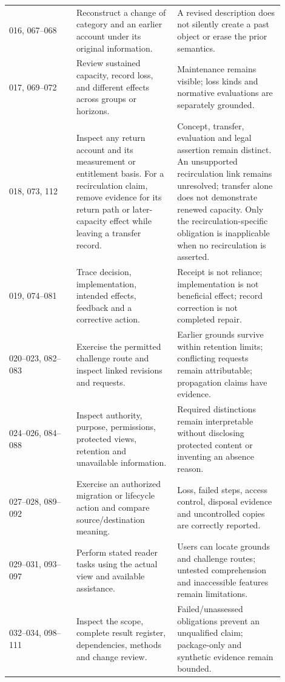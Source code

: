\documentclass[11pt,a4paper]{article}
\begin{document}
\begin{longtable}{@{}L{0.22\linewidth}L{0.33\linewidth}L{0.35\linewidth}@{}}
016, 067--068 & Reconstruct a change of category and an earlier account under its original information. & A revised description does not silently create a past object or erase the prior semantics.\\
017, 069--072 & Review sustained capacity, record loss, and different effects across groups or horizons. & Maintenance remains visible; loss kinds and normative evaluations are separately grounded.\\
018, 073, 112 & Inspect any return account and its measurement or entitlement basis. For a recirculation claim, remove evidence for its return path or later-capacity effect while leaving a transfer record. & Concept, transfer, evaluation and legal assertion remain distinct. An unsupported recirculation link remains unresolved; transfer alone does not demonstrate renewed capacity. Only the recirculation-specific obligation is inapplicable when no recirculation is asserted.\\
019, 074--081 & Trace decision, implementation, intended effects, feedback and a corrective action. & Receipt is not reliance; implementation is not beneficial effect; record correction is not completed repair.\\
020--023, 082--083 & Exercise the permitted challenge route and inspect linked revisions and requests. & Earlier grounds survive within retention limits; conflicting requests remain attributable; propagation claims have evidence.\\
024--026, 084--088 & Inspect authority, purpose, permissions, protected views, retention and unavailable information. & Required distinctions remain interpretable without disclosing protected content or inventing an absence reason.\\
027--028, 089--092 & Exercise an authorized migration or lifecycle action and compare source/destination meaning. & Loss, failed steps, access control, disposal evidence and uncontrolled copies are correctly reported.\\
029--031, 093--097 & Perform stated reader tasks using the actual view and available assistance. & Users can locate grounds and challenge routes; untested comprehension and inaccessible features remain limitations.\\
032--034, 098--111 & Inspect the scope, complete result register, dependencies, methods and change review. & Failed/unassessed obligations prevent an unqualified claim; package-only and synthetic evidence remain bounded.\\
\bottomrule
\end{longtable}
\end{document}
